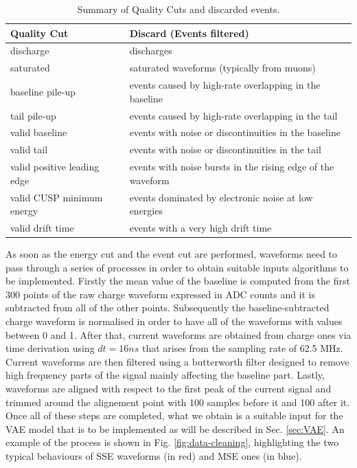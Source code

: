 \begin{table}[H]
    \centering
    \renewcommand{\arraystretch}{1.2} %
    \begin{tabular}{@{} l p{10cm} @{}}
        \toprule
        \textbf{Quality Cut} & \textbf{Discard (Events filtered)} \\
        \midrule
        discharge & discharges \\
        saturated & saturated waveforms (typically from muons) \\
        baseline pile-up & events caused by high-rate overlapping in the baseline \\
        tail pile-up & events caused by high-rate overlapping in the tail \\
        valid baseline & events with noise or discontinuities in the baseline \\
        valid tail & events with noise or discontinuities in the tail \\
        valid positive leading edge & events with noise bursts in the rising edge of the waveform \\
        valid CUSP minimum energy & events dominated by electronic noise at low energies \\
        valid drift time & events with a very high drift time \\
        \bottomrule
    \end{tabular}
    \caption{Summary of Quality Cuts and discarded events.}
    \label{tab:quality_cuts}
\end{table}

As soon as the energy cut and the event cut are performed, waveforms need to pass through a series of processes in order to obtain suitable inputs algorithms to be implemented. 
Firstly the mean value of the baseline is computed from the first 300 points of the raw charge waveform expressed in ADC counts and it is subtracted from all of the other points. Subsequently the baseline-subtracted charge waveform is normalised in order to have all of the waveforms with values between 0 and 1. After that, current waveforms are obtained from charge ones via time derivation using $dt = 16 ns$ that arises from the sampling rate of 62.5 MHz. Current waveforms are then filtered using a butterworth filter designed to remove high frequency parts of the signal mainly affecting the baseline part. Lastly, waveforms are aligned with respect to the first peak of the current signal and trimmed around the alignement point with 100 samples before it and 100 after it. 
Once all of these steps are completed, what we obtain is a suitable input for the \ac{VAE} model that is to be implemented as will be described in Sec. \ref{sec:VAE}. An example of the process is shown in Fig. \ref{fig:data-cleaning}, highlighting the two typical behaviours of \ac{SSE} waveforms (in red) and \ac{MSE} ones (in blue). %

